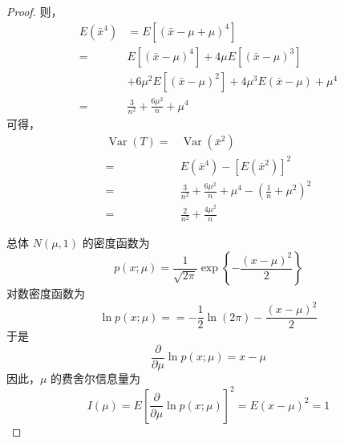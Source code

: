 \documentclass[normal,founder,mtpro2,cn]{elegantnote}
\begin{document}
\begin{enumerate}
\begin{proof}
            则，
            \begin{equation*}
                \begin{aligned}
                    E\left(\bar{x}^{4}\right) & =E\left[\left(\bar{x}-\mu+\mu\right)^{4}\right]                                            \\
                    =                         & E\left[\left(\bar{x}-\mu\right)^{4}\right]+4\mu E\left[\left(\bar{x}-\mu\right)^{3}\right] \\
                                              & +6\mu^{2}E\left[\left(\bar{x}-\mu\right)^{2}\right]+4\mu^{3}E(\bar{x}-\mu)+\mu^{4}         \\
                    =                         & \frac{3}{n^{2}}+\frac{6\mu^{2}}{n}+\mu^{4}
                \end{aligned}
            \end{equation*}
            可得，
            \begin{equation*}
                \begin{aligned}
                    \operatorname{Var}\left(T\right)= & \operatorname{Var}\left(\bar{x}^{2}\right)                                      \\
                    =                                 & E\left(\bar{x}^{4}\right)-\left[E\left(\bar{x}^{2}\right)\right]^{2}            \\
                    =                                 & \frac{3}{n^{2}}+\frac{6\mu^{2}}{n}+\mu^{4}-\left(\frac{1}{n}+\mu^{2}\right)^{2} \\
                    =                                 & \frac{2}{n^{2}}+\frac{4\mu^{2}}{n}
                \end{aligned}
            \end{equation*}

            总体 $N\left(\mu,1\right)$ 的密度函数为
            \begin{equation*}
                p\left(x;\mu\right)=\frac{1}{\sqrt{2\pi}}\exp\left\{-\frac{\left(x-\mu\right)^{2}}{2}\right\}
            \end{equation*}
            对数密度函数为
            \begin{equation*}
                \ln p\left(x;\mu\right)==-\frac{1}{2}\ln\left(2\pi\right)-\frac{\left(x-\mu\right)^{2}}{2}
            \end{equation*}
            于是
            \begin{equation*}
                \frac{\partial}{\partial\mu}\ln p\left(x;\mu\right)=x-\mu
            \end{equation*}
            因此，$\mu$ 的费舍尔信息量为
            \begin{equation*}
                I\left(\mu\right)=E\left[\frac{\partial}{\partial \mu}\ln p\left(x;\mu\right)\right]^{2}=E\left(x-\mu\right)^{2}=1
            \end{equation*}


\end{proof}
\end{enumerate}
\end{document}
